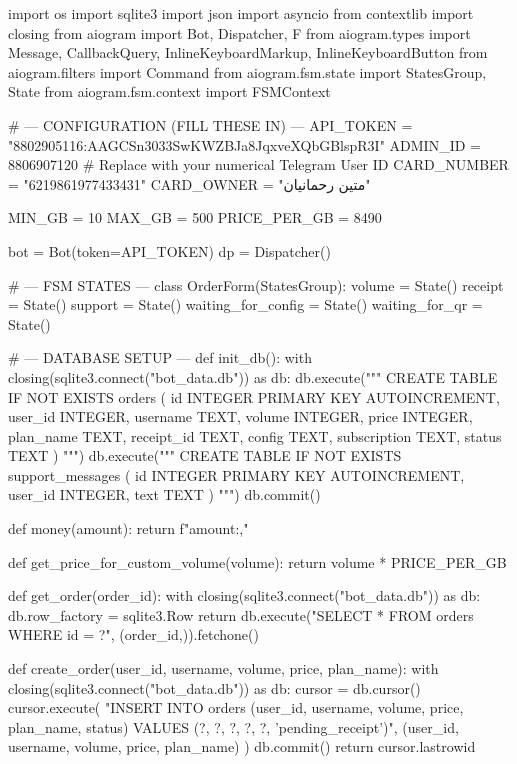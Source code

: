 import os
import sqlite3
import json
import asyncio
from contextlib import closing
from aiogram import Bot, Dispatcher, F
from aiogram.types import Message, CallbackQuery, InlineKeyboardMarkup, InlineKeyboardButton
from aiogram.filters import Command
from aiogram.fsm.state import StatesGroup, State
from aiogram.fsm.context import FSMContext

# --- CONFIGURATION (FILL THESE IN) ---
API_TOKEN = "8802905116:AAGCSn3033SwKWZBJa8JqxveXQbGBlspR3I"
ADMIN_ID = 8806907120  # Replace with your numerical Telegram User ID
CARD_NUMBER = "6219861977433431"
CARD_OWNER = "متین رحمانیان"

MIN_GB = 10
MAX_GB = 500
PRICE_PER_GB = 8490

bot = Bot(token=API_TOKEN)
dp = Dispatcher()

# --- FSM STATES ---
class OrderForm(StatesGroup):
    volume = State()
    receipt = State()
    support = State()
    waiting_for_config = State()
    waiting_for_qr = State()

# --- DATABASE SETUP ---
def init_db():
    with closing(sqlite3.connect("bot_data.db")) as db:
        db.execute("""
            CREATE TABLE IF NOT EXISTS orders (
                id INTEGER PRIMARY KEY AUTOINCREMENT,
                user_id INTEGER,
                username TEXT,
                volume INTEGER,
                price INTEGER,
                plan_name TEXT,
                receipt_id TEXT,
                config TEXT,
                subscription TEXT,
                status TEXT
            )
        """)
        db.execute("""
            CREATE TABLE IF NOT EXISTS support_messages (
                id INTEGER PRIMARY KEY AUTOINCREMENT,
                user_id INTEGER,
                text TEXT
            )
        """)
        db.commit()

def money(amount):
    return f"{amount:,}"

def get_price_for_custom_volume(volume):
    return volume * PRICE_PER_GB

def get_order(order_id):
    with closing(sqlite3.connect("bot_data.db")) as db:
        db.row_factory = sqlite3.Row
        return db.execute("SELECT * FROM orders WHERE id = ?", (order_id,)).fetchone()

def create_order(user_id, username, volume, price, plan_name):
    with closing(sqlite3.connect("bot_data.db")) as db:
        cursor = db.cursor()
        cursor.execute(
            "INSERT INTO orders (user_id, username, volume, price, plan_name, status) VALUES (?, ?, ?, ?, ?, 'pending_receipt')",
            (user_id, username, volume, price, plan_name)
        )
        db.commit()
        return cursor.lastrowid

